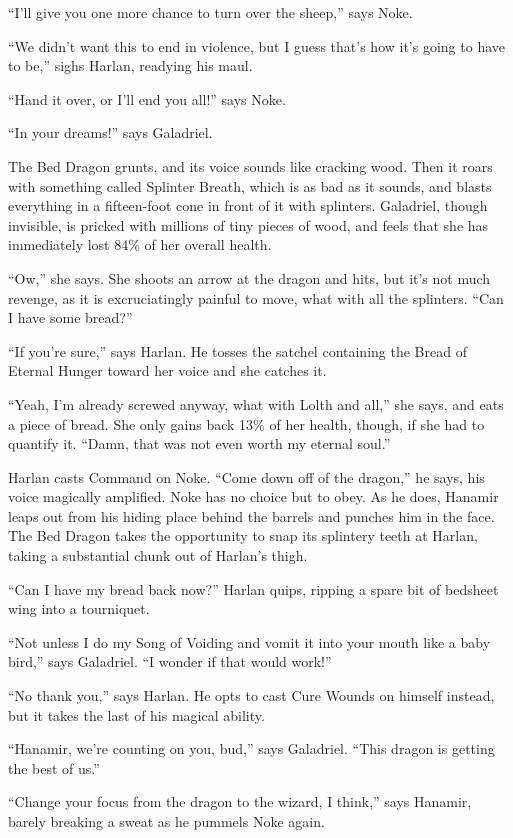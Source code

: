\documentclass[smalldemyvopaper,11pt,twoside,onecolumn,openright,extrafontsizes]{memoir}
\begin{document}
``I'll give you one more chance to turn over the sheep,'' says Noke.

``We didn't want this to end in violence, but I guess that's how it's
going to have to be,'' sighs Harlan, readying his maul.

``Hand it over, or I'll end you all!'' says Noke.

``In your dreams!'' says Galadriel.

The Bed Dragon grunts, and its voice sounds like cracking wood. Then it
roars with something called Splinter Breath, which is as bad as it
sounds, and blasts everything in a fifteen-foot cone in front of it with
splinters. Galadriel, though invisible, is pricked with millions of tiny
pieces of wood, and feels that she has immediately lost 84\% of her
overall health.

``Ow,'' she says. She shoots an arrow at the dragon and hits, but it's
not much revenge, as it is excruciatingly painful to move, what with all
the splinters. ``Can I have some bread?''

``If you're sure,'' says Harlan. He tosses the satchel containing the
Bread of Eternal Hunger toward her voice and she catches it.

``Yeah, I'm already screwed anyway, what with Lolth and all,'' she says,
and eats a piece of bread. She only gains back 13\% of her health,
though, if she had to quantify it. ``Damn, that was not even worth my
eternal soul.''

Harlan casts Command on Noke. ``Come down off of the dragon,'' he says,
his voice magically amplified. Noke has no choice but to obey. As he
does, Hanamir leaps out from his hiding place behind the barrels and
punches him in the face. The Bed Dragon takes the opportunity to snap
its splintery teeth at Harlan, taking a substantial chunk out of
Harlan's thigh.

``Can I have my bread back now?'' Harlan quips, ripping a spare bit of
bedsheet wing into a tourniquet.

``Not unless I do my Song of Voiding and vomit it into your mouth like a
baby bird,'' says Galadriel. ``I wonder if that would work!''

``No thank you,'' says Harlan. He opts to cast Cure Wounds on himself
instead, but it takes the last of his magical ability.

``Hanamir, we're counting on you, bud,'' says Galadriel. ``This dragon
is getting the best of us.''

``Change your focus from the dragon to the wizard, I think,'' says
Hanamir, barely breaking a sweat as he pummels Noke again.
\end{document}
